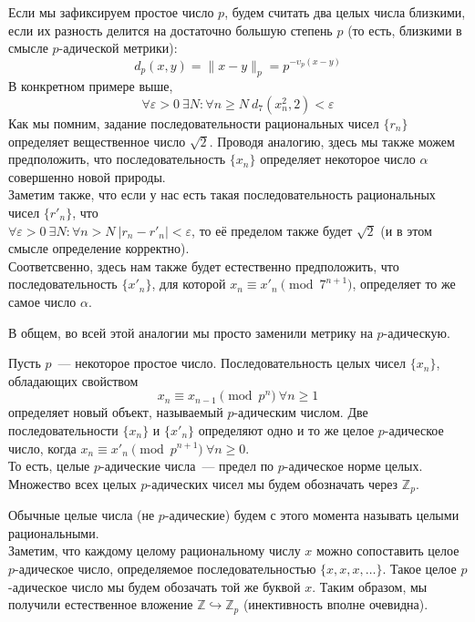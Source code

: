 \documentclass[11pt]{report}
\begin{document}
    Если мы зафиксируем простое число $p$, будем считать два целых числа близкими, если их разность делится на достаточно большую
    степень $p$ (то есть, близкими в смысле $p$-адической метрики):
    \[ d_p(x, y) = \| x - y \|_p = p^{-\upsilon_p(x - y)}\]
    В конкретном примере выше,
    \[ \forall \varepsilon > 0 \ \exists N\colon \forall n \ge N \  d_7(x_n^2, 2) < \varepsilon \]
    Как мы помним, задание последовательности рациональных чисел $\{ r_n \}$ определяет вещественное число $\sqrt{2}$.
    Проводя аналогию, здесь мы также можем предположить, что последовательность $\{ x_n \}$ определяет некоторое
    число $\alpha$ совершенно новой природы. \\
    Заметим также, что если у нас есть такая последовательность рациональных чисел $\{ r'_n \}$, что \\$\forall \varepsilon > 0 \ \exists N\colon \forall n > N \ |r_n - r'_n| < \varepsilon $, то
    её пределом также будет $\sqrt{2}$ (и в этом смысле определение корректно).\\
    Соответсвенно, здесь нам также будет естественно предположить, что последовательность $\{ x'_n \}$, для которой $x_n \equiv x'_n \pmod{7^{n + 1}}$, определяет то же самое число $\alpha$.
    \begin{remark}
        В общем, во всей этой аналогии мы просто заменили метрику на $p$-адическую.
    \end{remark}
    \begin{definition}
        Пусть $p$~--- некоторое простое число. Последовательность целых чисел $\{ x_n \}$, обладающих свойством
        \[ x_n \equiv x_{n - 1} \pmod{p^n} \ \forall n \ge 1\]
        определяет новый объект, называемый $p$-адическим числом. Две последовательности $\{ x_n \}$ и $\{ x'_n \}$ определяют одно и то же
        целое $p$-адическое число, когда $x_n \equiv x'_n \pmod{p^{n + 1}} \ \forall n \ge 0$.\\
        То есть, целые $p$-адические числа~--- предел по $p$-адическое норме целых.\\
        Множество всех целых $p$-адических чисел мы будем обозначать через $\mathbb{Z}_p$.\\
    \end{definition}
    Обычные целые числа (не $p$-адические) будем с этого момента называть целыми рациональными.\\


    Заметим, что каждому целому рациональному числу $x$ можно сопоставить целое $p$-адическое число, определяемое последовательностью
    $\{ x, x, x, \ldots \}$. Такое целое $p$-адическое число мы будем обозачать той же буквой $x$. Таким образом, мы получили естественное
    вложение $\mathbb{Z} \hookrightarrow \mathbb{Z}_p$ (инективность вполне очевидна).
\end{document}
